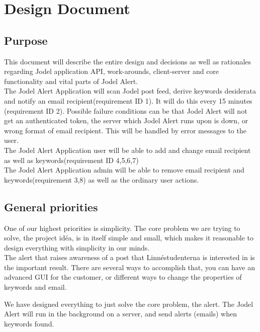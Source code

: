 \documentclass[a4paper,12pt]{article}
\begin{document}
\section{Design Document}
\subsection{Purpose}
This document will describe the entire design and decisions as well as  rationales regarding Jodel application API, work-arounds, client-server and core functionality and vital parts of Jodel Alert.\\

The Jodel Alert Application will scan Jodel post feed, derive keywords desiderata and notify an email recipient(requirement ID 1). It will do this every 15 minutes (requirement ID 2). Possible failure conditions can be that Jodel Alert will not get an authenticated token, the server which Jodel Alert runs upon is down, or wrong format of email recipient. This will be handled by error messages to the user.\\

The Jodel Alert Application user will be able to add and change email recipient as well as keywords(requirement ID 4,5,6,7)\\

The Jodel Alert Application admin will be able to remove email recipient and keywords(requirement 3,8) as well as the ordinary user actions.\\




\subsection{General priorities}
One of our highest priorities is simplicity. The core problem we are trying to solve, the project idéa, is in itself simple and small, which makes it reasonable to design everything with simplicity in our minds.\\

The alert that raises awareness of a post that Linnéstudenterna is interested in is the important result. There are several ways to accomplish that, you can have an advanced GUI for the customer, or different ways to change the properties of keywords and email. 
 
We have designed everything to just solve the core problem, the alert. The Jodel Alert will run in the background on a server, and send alerts (emails) when keywords found. \\
\end{document}
